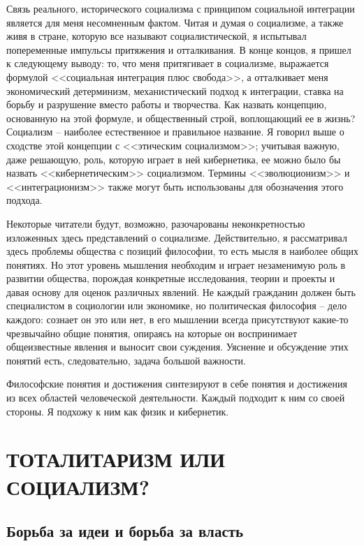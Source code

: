 \documentclass{book}
\newcommand{\MyEndNote}[1]{%
	\newpage
	\renewcommand\notesname{#1}
	\theendnotes
	\addcontentsline{toc}{section}{#1}
	\setcounter{endnote}{0}
}
\begin{document}
Связь реального, исторического социализма с принципом социальной интеграции является для меня несомненным фактом. Читая и думая о социализме, а также живя в стране, которую все называют социалистической, я испытывал попеременные импульсы притяжения и отталкивания. В конце концов, я при­шел к следующему выводу: то, что меня притягивает в социализ­ме, выражается формулой <<социальная интеграция плюс свобо­да>>, а отталкивает меня экономический детерминизм, механи­стический подход к интеграции, ставка на борьбу и разрушение вместо работы и творчества. Как назвать концепцию, основан­ную на этой формуле, и общественный строй, воплощающий ее в жизнь? Социализм -- наиболее естественное и правильное на­звание. Я говорил выше о сходстве этой концепции с <<этическим социализмом>>; учитывая важную, даже решающую, роль, которую играет в ней кибернетика, ее можно было бы назвать <<кибер­нетическим>> социализмом. Термины <<эволюционизм>> и <<интеграционизм>> также могут быть использованы для обозначения этого подхода.

Некоторые читатели будут, возможно, разочарованы неконк­ретностью изложенных здесь представлений о социализме. Дейст­вительно, я рассматривал здесь проблемы общества с позиций философии, то есть мысля в наиболее общих понятиях. Но этот уровень мышления необходим и играет незаменимую роль в раз­витии общества, порождая конкретные исследования, теории и проекты и давая основу для оценок различных явлений. Не каж­дый гражданин должен быть специалистом в социологии или экономике, но политическая философия -- дело каждого: со­знает он это или нет, в его мышлении всегда присутствуют какие-то чрезвычайно общие понятия, опираясь на которые он воспри­нимает общеизвестные явления и выносит свои суждения. Уяс­нение и обсуждение этих понятий есть, следовательно, задача большой важности.

Философские понятия и достижения синтезируют в себе поня­тия и достижения из всех областей человеческой деятельности. Каждый подходит к ним со своей стороны. Я подхожу к ним как физик и кибернетик.

\MyEndNote{Ссылки и примечания ко второй части}



\chapter{ТОТАЛИТАРИЗМ ИЛИ СОЦИАЛИЗМ?}

\section{Борьба за идеи и борьба за власть}
\end{document}
